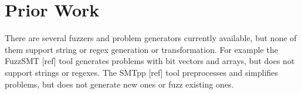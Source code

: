 \section{Prior Work}

    There are several fuzzers and problem generators currently available, but none of them support string or regex generation or transformation. For example the FuzzSMT [ref] tool generates \smt{} problems with bit vectors and arrays, but does not support strings or regexes. The SMTpp [ref] tool preprocesses and simplifies problems, but does not generate new ones or fuzz existing ones.

